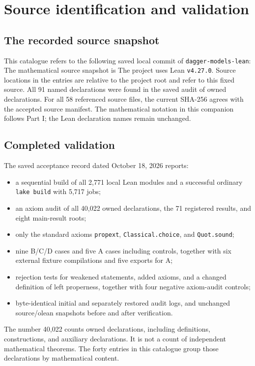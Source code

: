 \clearpage
\section{Source identification and validation}

\subsection{The recorded source snapshot}
This catalogue refers to the following saved local commit of \texttt{dagger-models-lean}:
The mathematical source snapshot is
The project uses Lean \texttt{v4.27.0}.
Source locations in the entries are relative to the project root and refer to this fixed source.
All 91 named declarations were found in the saved audit of owned declarations.
For all 58 referenced source files, the current SHA-256 agrees with the accepted source manifest.
The mathematical notation in this companion follows Part I; the Lean declaration names remain unchanged.

\subsection{Completed validation}
The saved acceptance record dated October 18, 2026 reports:
\begin{itemize}
\item a sequential build of all 2,771 local Lean modules and a successful ordinary \texttt{lake build} with 5,717 jobs;
\item an axiom audit of all 40,022 owned declarations, the 71 registered results, and eight main-result roots;
\item only the standard axioms \texttt{propext}, \texttt{Classical.choice}, and \texttt{Quot.sound};
\item nine B/C/D cases and five A cases including controls, together with six external fixture compilations and five exports for A;
\item rejection tests for weakened statements, added axioms, and a changed definition of left properness, together with four negative axiom-audit controls;
\item byte-identical initial and separately restored audit logs, and unchanged source/olean snapshots before and after verification.
\end{itemize}
The number 40,022 counts owned declarations, including definitions, constructions, and auxiliary declarations.
It is not a count of independent mathematical theorems.
The forty entries in this catalogue group those declarations by mathematical content.

